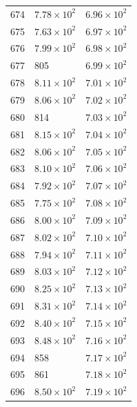 \begin{table}[H]
\begin{tabular}{lll}
674 & $\displaystyle 7.78 \times 10^{2}$ & $\displaystyle 6.96 \times 10^{2}$ \\
675 & $\displaystyle 7.63 \times 10^{2}$ & $\displaystyle 6.97 \times 10^{2}$ \\
676 & $\displaystyle 7.99 \times 10^{2}$ & $\displaystyle 6.98 \times 10^{2}$ \\
677 & 805 & $\displaystyle 6.99 \times 10^{2}$ \\
678 & $\displaystyle 8.11 \times 10^{2}$ & $\displaystyle 7.01 \times 10^{2}$ \\
679 & $\displaystyle 8.06 \times 10^{2}$ & $\displaystyle 7.02 \times 10^{2}$ \\
680 & 814 & $\displaystyle 7.03 \times 10^{2}$ \\
681 & $\displaystyle 8.15 \times 10^{2}$ & $\displaystyle 7.04 \times 10^{2}$ \\
682 & $\displaystyle 8.06 \times 10^{2}$ & $\displaystyle 7.05 \times 10^{2}$ \\
683 & $\displaystyle 8.10 \times 10^{2}$ & $\displaystyle 7.06 \times 10^{2}$ \\
684 & $\displaystyle 7.92 \times 10^{2}$ & $\displaystyle 7.07 \times 10^{2}$ \\
685 & $\displaystyle 7.75 \times 10^{2}$ & $\displaystyle 7.08 \times 10^{2}$ \\
686 & $\displaystyle 8.00 \times 10^{2}$ & $\displaystyle 7.09 \times 10^{2}$ \\
687 & $\displaystyle 8.02 \times 10^{2}$ & $\displaystyle 7.10 \times 10^{2}$ \\
688 & $\displaystyle 7.94 \times 10^{2}$ & $\displaystyle 7.11 \times 10^{2}$ \\
689 & $\displaystyle 8.03 \times 10^{2}$ & $\displaystyle 7.12 \times 10^{2}$ \\
690 & $\displaystyle 8.25 \times 10^{2}$ & $\displaystyle 7.13 \times 10^{2}$ \\
691 & $\displaystyle 8.31 \times 10^{2}$ & $\displaystyle 7.14 \times 10^{2}$ \\
692 & $\displaystyle 8.40 \times 10^{2}$ & $\displaystyle 7.15 \times 10^{2}$ \\
693 & $\displaystyle 8.48 \times 10^{2}$ & $\displaystyle 7.16 \times 10^{2}$ \\
694 & 858 & $\displaystyle 7.17 \times 10^{2}$ \\
695 & 861 & $\displaystyle 7.18 \times 10^{2}$ \\
696 & $\displaystyle 8.50 \times 10^{2}$ & $\displaystyle 7.19 \times 10^{2}$ \\

\end{tabular}
\end{table}
